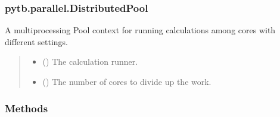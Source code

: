\documentclass[letterpaper,10pt,english,openany,oneside]{sphinxmanual}
\begin{document}
\sphinxstepscope


\subsubsection{pytb.parallel.DistributedPool}
\label{\detokenize{api/pytb.parallel.DistributedPool:pytb-parallel-distributedpool}}\label{\detokenize{api/pytb.parallel.DistributedPool::doc}}

\begin{fulllineitems}
\label{\detokenize{api/pytb.parallel.DistributedPool:pytb.parallel.DistributedPool}}
\pysigstartsignatures
{}
\pysigstopsignatures
\sphinxAtStartPar
A multiprocessing Pool context for running
calculations among cores with different settings.
\begin{quote}\begin{description}
\begin{itemize}
\item {} 
\sphinxAtStartPar
{} ({\hyperref[\detokenize{api/pytb.parallel.MPRunner:pytb.parallel.MPRunner}]{}}) \textendash{} The calculation runner.

\item {} 
\sphinxAtStartPar
{} () \textendash{} The number of cores to divide up the work.

\end{itemize}

\end{description}\end{quote}
\subsubsection*{Methods}



\end{fulllineitems}
\end{document}
